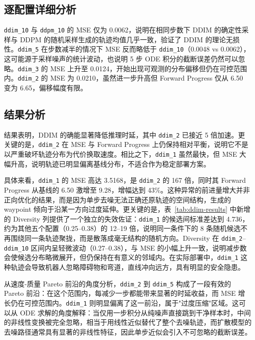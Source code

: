 \subsection{逐配置详细分析}

\texttt{ddim\_10} 与 \texttt{ddpm\_10} 的 MSE 仅为 0.0062，说明在相同步数下 DDIM 的确定性采样与 DDPM 的随机采样生成的轨迹均值几乎一致，验证了 DDIM 的理论无损性。\texttt{ddim\_5} 在步数减半的情况下 MSE 反而略低于 \texttt{ddim\_10}（0.0048 vs 0.0062），这可能源于采样噪声的统计波动，也说明 5 步 ODE 积分的截断误差仍然可以忽略。\texttt{ddim\_3} 的 MSE 上升至 0.0124，开始出现可观测的分布偏移但仍在可控范围内。\texttt{ddim\_2} 的 MSE 为 0.0210，虽然进一步升高但 Forward Progress 仅从 6.50 变为 6.65，偏移幅度有限。

\subsection{结果分析}

结果表明，DDIM 的确能显著降低推理时延，其中 \texttt{ddim\_2} 已接近 5 倍加速。更关键的是，\texttt{ddim\_2} 在 MSE 与 Forward Progress 上仍保持相对平衡，说明它不是以严重破坏轨迹分布为代价换取速度。相比之下，\texttt{ddim\_1} 虽然最快，但 MSE 大幅升高，说明轨迹已明显偏离基线分布，不适合作为稳定部署方案。

具体来看，\texttt{ddim\_1} 的 MSE 高达 3.5168，是 \texttt{ddim\_2} 的 167 倍，同时其 Forward Progress 从基线的 6.50 激增至 9.28，增幅达到 43\%。这种异常的前进量增大并非正向优化的结果，而是因为单步去噪无法正确还原轨迹的空间结构，生成的 waypoint 倾向于沿某一方向过度延伸。更关键的是，表~\ref{tab:ddim-results} 中新增的 Diversity 列提供了一个独立的失效佐证：\texttt{ddim\_1} 的候选间标准差达到 4.736，约为其他五个配置（0.25--0.38）的 12--19 倍，说明同一条件下的 8 条随机候选不再围绕同一条轨迹聚拢，而是散落成毫无结构的随机方向。Diversity 在 \texttt{ddim\_2}--\texttt{ddim\_10} 区间内呈轻微波动（0.27--0.38），与 MSE 的小幅上升一致，说明减步数会使候选分布略微展开，但仍保持在有意义的邻域内。在实际部署中，\texttt{ddim\_1} 这种轨迹会导致机器人忽略障碍物和弯道，直线冲向远方，具有明显的安全隐患。

从速度-质量 Pareto 前沿的角度分析，\texttt{ddim\_2} 到 \texttt{ddim\_5} 构成了一段有效的 Pareto 前沿：在这个范围内，每减少一步都能带来显著的时延收益，而 MSE 增长仍在可控范围内。\texttt{ddim\_1} 则明显偏离了这一前沿，属于"过度压缩"区域。这可以从 ODE 求解的角度解释：当仅用一步积分从纯噪声直接跳到干净样本时，中间的非线性变换被完全忽略，相当于用线性近似替代了整个去噪轨迹，而扩散模型的去噪路径通常具有显著的非线性特征，因此单步近似会引入不可忽略的截断误差。

